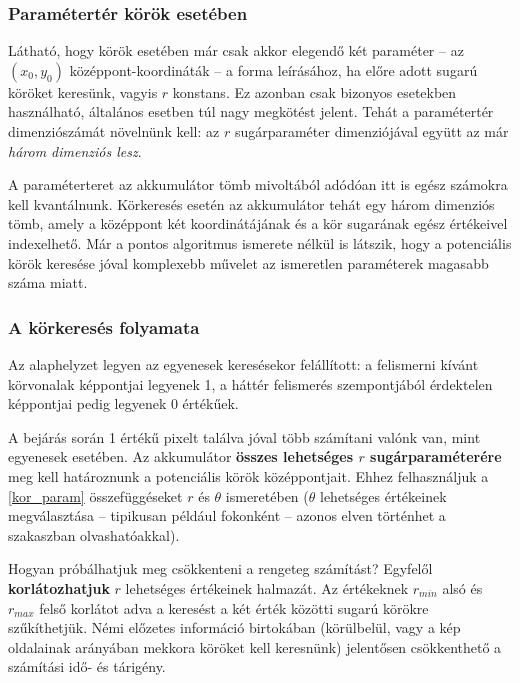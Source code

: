 \subsubsection{Paramétertér körök esetében}\label{sect:korok_parameterter}

Látható, hogy körök esetében már csak akkor elegendő két paraméter -- az $ (x_{0}, y_{0}) $ középpont-koordináták -- a forma leírásához, ha előre adott sugarú köröket keresünk, vagyis $ r $ konstans. Ez azonban csak bizonyos esetekben használható, általános esetben túl nagy megkötést jelent. Tehát a paramétertér dimenziószámát növelnünk kell: az $ r $ sugárparaméter dimenziójával együtt az már \emph{három dimenziós lesz}.

A paraméterteret az akkumulátor tömb mivoltából adódóan itt is egész számokra kell kvantálnunk. Körkeresés esetén az akkumulátor tehát egy három dimenziós tömb, amely a középpont két koordinátájának és a kör sugarának egész értékeivel indexelhető. Már a pontos algoritmus ismerete nélkül is látszik, hogy a potenciális körök keresése jóval komplexebb művelet az ismeretlen paraméterek magasabb száma miatt.

\subsubsection{A körkeresés folyamata}\label{sect:korok_keresese}

Az alaphelyzet legyen az egyenesek keresésekor felállított: a felismerni kívánt körvonalak képpontjai legyenek 1, a háttér felismerés szempontjából érdektelen képpontjai pedig legyenek 0 értékűek.

A bejárás során 1 értékű pixelt találva jóval több számítani valónk van, mint egyenesek esetében. Az akkumulátor \textbf{összes lehetséges $ r $ sugárparaméterére} meg kell határoznunk a potenciális körök középpontjait. Ehhez felhasználjuk a \eqref{kor_param} összefüggéseket $ r $ és $ \theta $ ismeretében ($ \theta $ lehetséges értékeinek megválasztása -- tipikusan például fokonként -- azonos elven történhet a  szakaszban olvashatóakkal).

Hogyan próbálhatjuk meg csökkenteni a rengeteg számítást? Egyfelől \textbf{korlátozhatjuk} $ r $ lehetséges értékeinek halmazát. Az értékeknek $ r_{min} $ alsó és $ r_{max} $ felső korlátot adva a keresést a két érték közötti sugarú körökre szűkíthetjük. Némi előzetes információ birtokában (körülbelül, vagy a kép oldalainak arányában mekkora köröket kell keresnünk) jelentősen csökkenthető a számítási idő- és tárigény.

